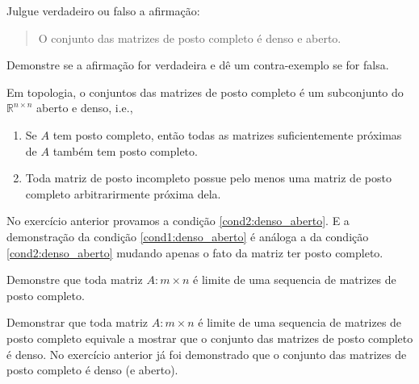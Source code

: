 \documentclass[a4paper,12pt, leqno, answers]{exam}
\begin{document}
\begin{questions}

     Julgue verdadeiro ou falso a afirma\c{c}\~{a}o:
    \begin{quote}
        O conjunto das matrizes de posto completo \'{e} denso e aberto.
    \end{quote}
    Demonstre se a afirma\c{c}\~{a}o for verdadeira e d\^{e} um contra-exemplo se for falsa.
    \begin{solution}
        Em topologia, o conjuntos das matrizes de posto completo \'{e} um subconjunto do $\mathbb{R}^{n \times n}$ aberto e denso, i.e.,
        \begin{enumerate}
            \item Se $A$ tem posto completo, ent\~{a}o todas as matrizes suficientemente pr\'{o}ximas de $A$ tamb\'{e}m tem posto completo. \label{cond1:denso_aberto}
            \item Toda matriz de posto incompleto possue pelo menos uma matriz de posto completo arbitrarirmente pr\'{o}xima dela. \label{cond2:denso_aberto}
        \end{enumerate}
        No exerc\'{i}cio anterior provamos a condi\c{c}\~{a}o \ref{cond2:denso_aberto}. E a demonstra\c{c}\~{a}o da condi\c{c}\~{a}o \ref{cond1:denso_aberto} \'{e} an\'{a}loga a da condi\c{c}\~{a}o \ref{cond2:denso_aberto} mudando apenas o fato da matriz ter posto completo.
    \end{solution}

    \question Demonstre que toda matriz $A : m \times n$ \'{e} limite de uma sequencia de matrizes de posto completo.
    \begin{solution}
        Demonstrar que toda matriz $A : m \times n$ \'{e} limite de uma sequencia de matrizes de posto completo equivale a mostrar que o conjunto das matrizes de posto completo \'{e} denso. No exerc\'{i}cio anterior j\'{a} foi demonstrado que o conjunto das matrizes de posto completo \'{e} denso (e aberto).
    \end{solution}


\end{questions}
\end{document}
